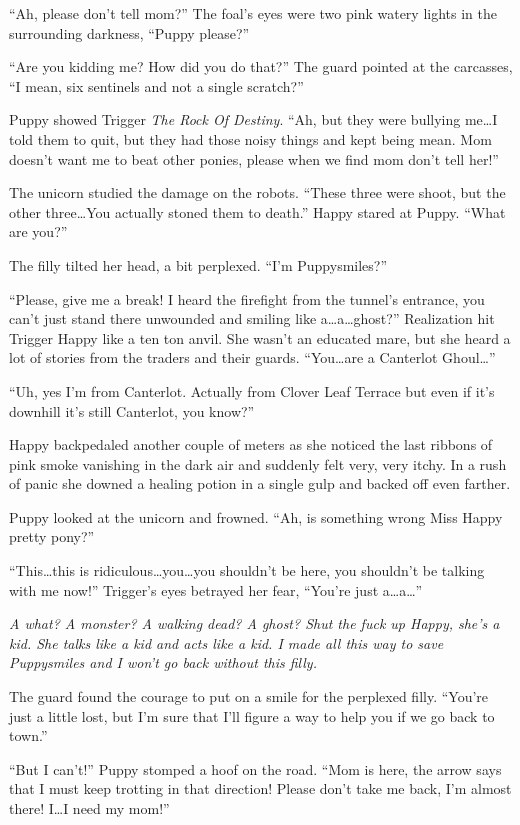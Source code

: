 ``Ah, please don't tell mom?'' The foal's eyes were two pink watery lights in the surrounding darkness, ``Puppy please?''

``Are you kidding me? How did you do that?'' The guard pointed at the carcasses, ``I mean, six sentinels and not a single scratch?''

Puppy showed Trigger \emph{The Rock Of Destiny}. ``Ah, but they were bullying me\dots I told them to quit, but they had those noisy things and kept being mean. Mom doesn't want me to beat other ponies, please when we find mom don't tell her!''

The unicorn studied the damage on the robots. ``These three were shoot, but the other three\dots You actually stoned them to death.'' Happy stared at Puppy. ``What are you?''

The filly tilted her head, a bit perplexed. ``I'm Puppysmiles?''

``Please, give me a break! I heard the firefight from the tunnel's entrance, you can't just stand there unwounded and smiling like a\dots a\dots ghost?'' Realization hit Trigger Happy like a ten ton anvil. She wasn't an educated mare, but she heard a lot of stories from the traders and their guards. ``You\dots are a Canterlot Ghoul\dots''

``Uh, yes I'm from Canterlot. Actually from Clover Leaf Terrace but even if it's downhill it's still Canterlot, you know?''

Happy backpedaled another couple of meters as she noticed the last ribbons of pink smoke vanishing in the dark air and suddenly felt very, very itchy. In a rush of panic she downed a healing potion in a single gulp and backed off even farther.

Puppy looked at the unicorn and frowned. ``Ah, is something wrong Miss Happy pretty pony?''

``This\dots this is ridiculous\dots you\dots you shouldn't be here, you shouldn't be talking with me now!'' Trigger's eyes betrayed her fear, ``You're just a\dots a\dots''

\emph{A what? A monster? A walking dead? A ghost? Shut the fuck up Happy, she's a kid. She talks like a kid and acts like a kid. I made all this way to save Puppysmiles and I won't go back without this filly.}

The guard found the courage to put on a smile for the perplexed filly. ``You're just a little lost, but I'm sure that I'll figure a way to help you if we go back to town.''

``But I can't!'' Puppy stomped a hoof on the road. ``Mom is here, the arrow says that I must keep trotting in that direction! Please don't take me back, I'm almost there! I\dots I need my mom!''

